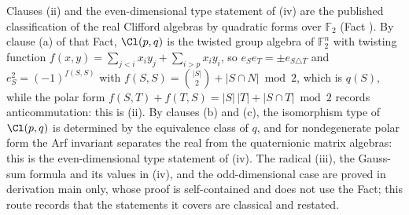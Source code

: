 Clauses (ii) and the even-dimensional type statement of (iv) are the published classification of the real Clifford algebras by quadratic forms over $\mathbb{F}_{2}$ (Fact ). By clause (a) of that Fact, $\Cl(p,q)$ is the twisted group algebra of $\mathbb{F}_{2}^{n}$ with twisting function $f(x, y) = \sum_{j < i}x_{i}y_{j} + \sum_{i > p}x_{i}y_{i}$, so $e_{S}e_{T} = \pm e_{S \triangle T}$ and $e_{S}^{2} = (-1)^{f(S,S)}$ with $f(S, S) = \binom{|S|}{2} + |S \cap N| \bmod 2$, which is $q(S)$, while the polar form $f(S,T) + f(T,S) = |S|\,|T| + |S \cap T| \bmod 2$ records anticommutation: this is (ii). By clauses (b) and (c), the isomorphism type of $\Cl(p,q)$ is determined by the equivalence class of $q$, and for nondegenerate polar form the Arf invariant separates the real from the quaternionic matrix algebras: this is the even-dimensional type statement of (iv). The radical (iii), the Gauss-sum formula and its values in (iv), and the odd-dimensional case are proved in derivation main only, whose proof is self-contained and does not use the Fact; this route records that the statements it covers are classical and restated.
